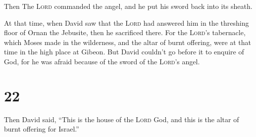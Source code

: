  Then The \textsc{Lord} commanded the angel, and he put
his sword back into its sheath.

 At that time, when David saw that the \textsc{Lord} had
answered him in the threshing floor of Ornan the Jebusite, then he
sacrificed there.  For the \textsc{Lord}'s tabernacle,
which Moses made in the wilderness, and the altar of burnt offering,
were at that time in the high place at Gibeon.  But David
couldn't go before it to enquire of God, for he was afraid because of
the sword of the \textsc{Lord}'s angel.

\hypertarget{section-21}{%
\section{22}\label{section-21}}

 Then David said, ``This is the house of the \textsc{Lord}
God, and this is the altar of burnt offering for Israel.''

